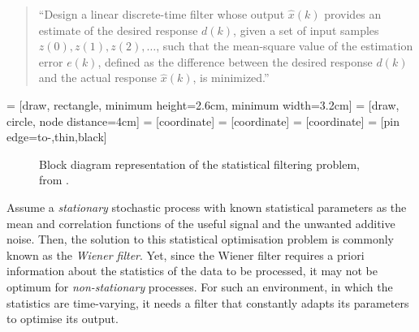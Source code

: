 \begin{quote}``Design a linear discrete-time filter whose output $\hat{x}(k)$ provides an estimate of the desired response $d(k)$, given a set of input samples $z(0), z(1), z(2), \dots$, such that the mean-square value of the estimation error $e(k)$, defined as the difference between the desired response $d(k)$ and the actual response $\hat{x}(k)$, is minimized.''
\end{quote}

 = [draw, rectangle, 
    minimum height=2.6cm, minimum width=3.2cm]
 = [draw, circle, node distance=4cm]
 = [coordinate]
 = [coordinate]
 = [coordinate]
 = [pin edge={to-,thin,black}]

\begin{figure}
\centering
{}
\caption{Block diagram representation of the statistical filtering problem, from \cite{haykin2002adaptive}.} \label{fig:filtering_problem}
\end{figure}

Assume a \emph{stationary} stochastic process with known statistical parameters as the mean and correlation functions of the useful signal and the unwanted additive noise. Then, the solution to this statistical optimisation problem is commonly known as the \emph{Wiener filter}. Yet, since the Wiener filter requires a priori information about the statistics of the data to be processed, it may not be optimum for \emph{non-stationary} processes. For such an environment, in which the statistics are time-varying, it needs a filter that constantly adapts its parameters to optimise its output.

